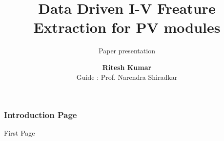\documentclass{beamer}
\title[DDP Phase 1]{\textbf{\large Data Driven I-V Freature Extraction for PV modules}}
\subtitle{Paper presentation}
\author [Ritesh Kumar]{\textbf{Ritesh Kumar} \\ Guide : Prof. Narendra Shiradkar}
\institute[IITB]{Electrical Engineering \\ IIT Bombay}
\begin{document}
	\begin{frame}[t]
		\titlepage
	\end{frame}

	\begin{frame}[t]
	\frametitle{Introduction Page}
		First Page
	\end{frame}
\end{document}
